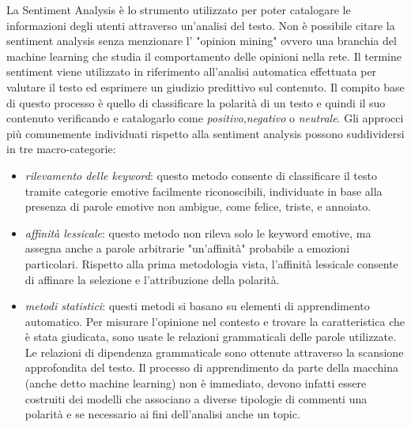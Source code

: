 La Sentiment Analysis è lo strumento utilizzato per poter catalogare le informazioni degli utenti attraverso un'analisi del testo. Non è possibile citare la sentiment analysis senza menzionare l' "opinion mining" ovvero una branchia del machine learning che studia il comportamento delle opinioni nella rete.
Il termine sentiment viene utilizzato in riferimento all'analisi automatica effettuata per valutare il testo ed esprimere un giudizio predittivo sul contenuto.
Il compito base di questo processo è quello di classificare la polarità di un testo e quindi il suo contenuto verificando e catalogarlo come \textit{positivo},\textit{negativo} o \textit{neutrale}.
Gli approcci più comunemente individuati rispetto alla sentiment analysis possono suddividersi in tre macro-categorie: 
\begin{itemize}
\item \textit{rilevamento delle keyword}: questo metodo consente di classificare il testo tramite categorie emotive facilmente riconoscibili, individuate in base alla presenza di parole emotive non ambigue, come felice, triste, e annoiato.
\item \textit{affinità lessicale}: questo metodo non rileva solo le keyword emotive, ma assegna anche a parole arbitrarie "un'affinità" probabile a emozioni particolari. Rispetto alla prima metodologia vista, l'affinità lessicale consente di affinare la selezione e l'attribuzione della polarità.
\item \textit{metodi statistici}: questi metodi si basano su elementi di apprendimento automatico. Per misurare l'opinione nel contesto e trovare la caratteristica che è stata giudicata, sono usate le relazioni grammaticali delle parole utilizzate. Le relazioni di dipendenza grammaticale sono ottenute attraverso la scansione approfondita del testo. Il processo di apprendimento da parte della macchina (anche detto machine learning) non è immediato, devono infatti essere costruiti dei modelli che associano a diverse tipologie di commenti una polarità e se necessario ai fini dell'analisi anche un topic.
\end{itemize}

